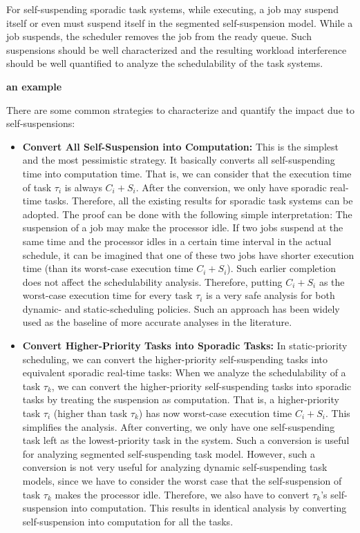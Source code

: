 For self-suspending sporadic task systems, while executing, a job may suspend itself or even must suspend itself in the segmented self-suspension model. While a job suspends, the scheduler removes the job from the ready queue. Such suspensions should be well characterized and the resulting workload interference should be well quantified to analyze the schedulability of the task systems. 

{\bf an example}

There are some common strategies to characterize and quantify the impact due to self-suspensions:
\begin{itemize}
\item {\bf Convert All Self-Suspension into Computation:} This is the simplest and the most pessimistic strategy. It basically converts all self-suspending time into computation time. That is, we can consider that the execution time of task $\tau_i$ is always $C_i+S_i$. After the conversion, we only have sporadic real-time tasks. Therefore, all the existing results for sporadic task systems can be adopted. The proof can be done with the following simple interpretation: The suspension of a job may make the processor idle. If two jobs suspend at the same time and the processor idles in a certain time interval in the actual schedule, it can be imagined that one of these two jobs have shorter execution time (than its worst-case execution time $C_i+S_i$). Such earlier completion does not affect the schedulability analysis. Therefore, putting $C_i+S_i$ as the worst-case execution time for every task $\tau_i$ is a very safe analysis for both dynamic- and static-scheduling policies.  Such an approach has been widely used as the baseline of more accurate analyses in the literature.

\item {\bf Convert Higher-Priority Tasks into Sporadic Tasks:} In static-priority scheduling, we can convert the higher-priority self-suspending tasks into equivalent sporadic real-time tasks: When we analyze the schedulability of a task $\tau_k$, we can convert the higher-priority self-suspending tasks into sporadic tasks by treating the suspension as computation. That is, a higher-priority task $\tau_i$ (higher than task $\tau_k$) has now worst-case execution time $C_i+S_i$. This simplifies the analysis. After converting, we only have one self-suspending task left as the lowest-priority task in the system.  Such a conversion is useful for analyzing segmented self-suspending task model. However, such a conversion is not very useful for analyzing dynamic self-suspending task models, since we have to consider the worst case that the self-suspension of task $\tau_k$ makes the processor idle. Therefore, we also have to convert $\tau_k$'s self-suspension into computation. This results in identical analysis by converting self-suspension into computation for all the tasks. 


\end{itemize}
